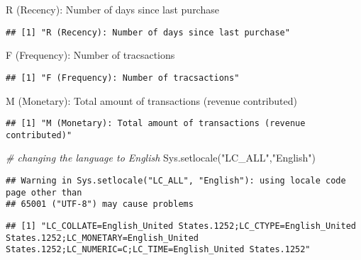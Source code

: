 \documentclass[
]{article}
\newenvironment{Shaded}{\begin{snugshade}}{\end{snugshade}}
\newcommand{\CommentTok}[1]{\textcolor[rgb]{0.56,0.35,0.01}{\textit{#1}}}
\newcommand{\FunctionTok}[1]{\textcolor[rgb]{0.00,0.00,0.00}{#1}}
\newcommand{\NormalTok}[1]{#1}
\newcommand{\StringTok}[1]{\textcolor[rgb]{0.31,0.60,0.02}{#1}}
\begin{document}
\begin{Shaded}
\begin{Highlighting}[]
\StringTok{\textquotesingle{}R (Recency): Number of days since last purchase\textquotesingle{}}
\end{Highlighting}
\end{Shaded}

\begin{verbatim}
## [1] "R (Recency): Number of days since last purchase"
\end{verbatim}

\begin{Shaded}
\begin{Highlighting}[]
\StringTok{\textquotesingle{}F (Frequency): Number of tracsactions\textquotesingle{}}
\end{Highlighting}
\end{Shaded}

\begin{verbatim}
## [1] "F (Frequency): Number of tracsactions"
\end{verbatim}

\begin{Shaded}
\begin{Highlighting}[]
\StringTok{\textquotesingle{}M (Monetary): Total amount of transactions (revenue contributed)\textquotesingle{}}
\end{Highlighting}
\end{Shaded}

\begin{verbatim}
## [1] "M (Monetary): Total amount of transactions (revenue contributed)"
\end{verbatim}

\begin{Shaded}
\begin{Highlighting}[]
\CommentTok{\# changing the language to English}
\FunctionTok{Sys.setlocale}\NormalTok{(}\StringTok{"LC\_ALL"}\NormalTok{,}\StringTok{"English"}\NormalTok{)}
\end{Highlighting}
\end{Shaded}

\begin{verbatim}
## Warning in Sys.setlocale("LC_ALL", "English"): using locale code page other than
## 65001 ("UTF-8") may cause problems
\end{verbatim}

\begin{verbatim}
## [1] "LC_COLLATE=English_United States.1252;LC_CTYPE=English_United States.1252;LC_MONETARY=English_United States.1252;LC_NUMERIC=C;LC_TIME=English_United States.1252"
\end{verbatim}
\end{document}
